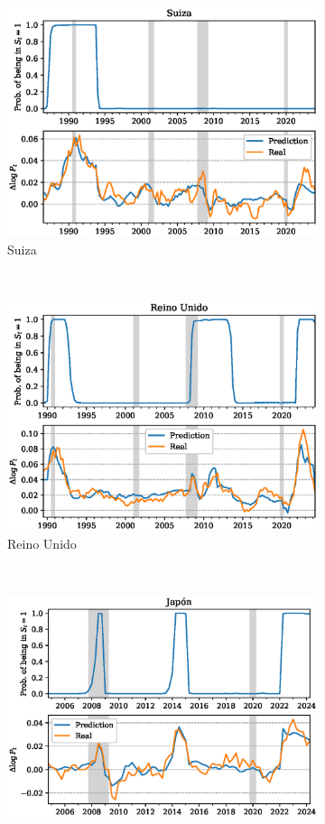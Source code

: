 \documentclass[titlepage, 12pt]{article}
\begin{document}
\begin{figure}
\begin{subfigure}[b]{0.49\textwidth}
        \includegraphics[width=\textwidth]{plots/ch-markov-cpi.eps}
        \caption{Suiza}
    \end{subfigure}
    ~
    \begin{subfigure}[b]{0.49\textwidth}
        \includegraphics[width=\textwidth]{plots/uk-markov-cpi.eps}
        \caption{Reino Unido}
    \end{subfigure}
    ~
    \begin{subfigure}[b]{0.49\textwidth}
        \includegraphics[width=\textwidth]{plots/jp-markov-cpi.eps}

\end{subfigure}
\end{figure}
\end{document}
